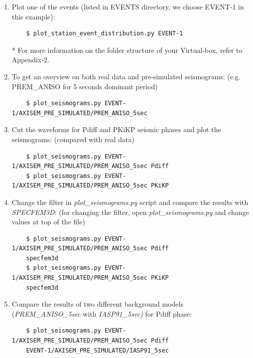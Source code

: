 \documentclass{article}
\begin{document}
\begin{enumerate}
    
    \item Plot one of the events (listed in EVENTS directory, we choose EVENT-1 in this
    example):
    
    \begin{verbatim}
    $ plot_station_event_distribution.py EVENT-1
    \end{verbatim}
    * For more information on the folder structure of your Virtual-box, refer to
    Appendix-2.
    
    \item To get an overview on both real data and pre-simulated seismograms: 
    (e.g.  PREM\_ANISO for 5 seconds dominant period)
    \begin{verbatim}
    $ plot_seismograms.py EVENT-1/AXISEM_PRE_SIMULATED/PREM_ANISO_5sec
    \end{verbatim}
    
    \item Cut the waveforms for Pdiff and PKiKP seismic phases and plot the seismograms: 
    (compared with real data)
    \begin{verbatim}
    $ plot_seismograms.py EVENT-1/AXISEM_PRE_SIMULATED/PREM_ANISO_5sec Pdiff
    $ plot_seismograms.py EVENT-1/AXISEM_PRE_SIMULATED/PREM_ANISO_5sec PKiKP
    \end{verbatim}
    
    \item Change the filter in \textit{plot\_seismograms.py} script and compare the
    results with \textit{SPECFEM3D}: (for changing the filter, open
    \textit{plot\_seismograms.py} and change values at top of the file)
    
    \begin{verbatim}
    $ plot_seismograms.py EVENT-1/AXISEM_PRE_SIMULATED/PREM_ANISO_5sec Pdiff 
    specfem3d
    $ plot_seismograms.py EVENT-1/AXISEM_PRE_SIMULATED/PREM_ANISO_5sec PKiKP 
    specfem3d
    \end{verbatim}
    
    \item Compare the results of two different background models
    (\textit{PREM\_ANISO\_5sec} with \textit{IASP91\_5sec)} for Pdiff phase:
    
    \begin{verbatim}
    $ plot_seismograms.py EVENT-1/AXISEM_PRE_SIMULATED/PREM_ANISO_5sec Pdiff 
    EVENT-1/AXISEM_PRE_SIMULATED/IASP91_5sec
    \end{verbatim}
    

\end{enumerate}
\end{document}

